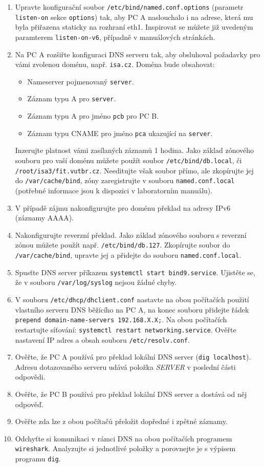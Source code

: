 \begin{enumerate}
  \item Upravte konfigurační soubor {\tt /etc/bind/named.conf.options} (parametr
    {\tt listen-on} sekce {\tt options}) tak, aby
    PC A naslouchalo i na adrese, která mu byla přiřazena staticky na rozhraní eth1.
    Inspirovat se můžete již uvedeným paramterem {\tt listen-on-v6}, případně v
    manuálových stránkách.
  \item Na PC A rozšiřte konfiguraci DNS serveru tak, aby obsluhoval požadavky pro vámi
    zvolenou doménu, např. {\tt isa.cz}. Doména bude obsahovat:
    \begin{itemize}
      \item Nameserver pojmenovaný {\tt server}.
      \item Záznam typu A pro {\tt server}.
      \item Záznam typu A pro jméno {\tt pcb} pro PC B.
      \item Záznam typu CNAME pro jméno {\tt pca} ukazující na {\tt server}.
    \end{itemize}
    Inzerujte platnost vámi zasílaných záznamů 1 hodina.
    Jako základ zónového souboru pro vaší
    doménu můžete použít soubor {\tt /etc/bind/db.local}, či {\tt
    /root/isa3/fit.vutbr.cz}.
    Needitujte však soubor přímo, ale zkopírujte jej do {\tt /var/cache/bind}, zóny zaregistrujte v
    souboru {\tt named.conf.local} (potřebné informace jsou k dispozici v
    laboratorním manuálu).
  \item V případě zájmu nakonfigurujte pro doménu překlad na adresy IPv6
    (záznamy AAAA).
  \item Nakonfigurujte reverzní překlad. Jako základ
    zónového souboru s reverzní zónou můžete použít např. {\tt /etc/bind/db.127}.
    Zkopírujte soubor do {\tt /var/cache/bind}, upravte jej a přidejte do
    souboru {\tt named.conf.local}.
  \item Spusťte DNS server příkazem {\tt systemctl start bind9.service}.
    Ujistěte se, že v souboru {\tt /var/log/syslog} nejsou žádné chyby.
  \item V souboru {\tt /etc/dhcp/dhclient.conf} nastavte na obou počítačích použití vlastního
    serveru DNS běžícího na PC A, na konec souboru přidejte řádek
    {\tt prepend domain-name-servers
    192.168.X.X;}. Na obou počítačích restartujte síťování: {\tt systemctl restart networking.service}.
    Ověřte nastavení IP adres a obsah souboru {\tt /etc/resolv.conf}.
  \item Ověřte, že PC A používá pro překlad lokální DNS server ({\tt dig
    localhost}). Adresu dotazovaného serveru udává položka {\em SERVER} v
    poslední části odpovědi.
  \item Ověřte, že PC B používá pro překlad lokální DNS server a dostává od něj odpověď.
  \item Ověřte zda lze z obou počítačů přeložit dopředné i zpětné záznamy.
  \item Odchyťte si komunikaci v rámci DNS na obou počítačích programem
    {\tt wireshark}. Analyzujte si jednotlivé položky a porovnejte je s výpisem
    programu {\tt dig}.

\end{enumerate}

